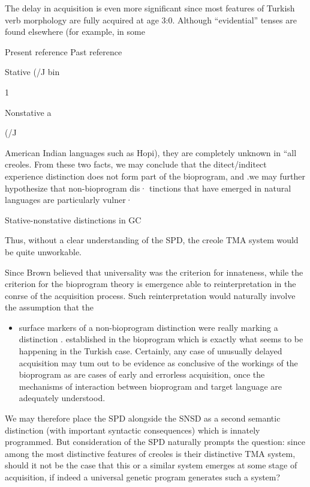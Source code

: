 The delay in acquisition is even more significant since most features of Turkish verb morphology are fully acquired at age 3:0. Although ``evidential'' tenses are found elsewhere (for example, in some

Present reference Past reference

Stative (/J bin

\begin{table}
\caption{1}
\label{tab:3}
\end{table}

Nonstative a

(/J

American Indian languages such as Hopi), they are completely un\-known in ``all creoles. From these two facts, we may conclude that the ditect/inditect experience distinction does not form part of the bio\-program, and .we may further hypothesize that non-bioprogram dis· tinctions that have emerged in natural languages are particularly vulner·

Stative-nonstative distinctions in GC

Thus, without a clear understanding of the SPD, the creole TMA system would be quite unworkable.

Since Brown believed that universality was the criterion for innateness, while the criterion for the bioprogram theory is emergence
able to reinterpretation in the conrse of the acquisition process. Such reinterpretation would naturally involve the assumption that the

\begin{itemize}
\item surface markers of a non-bioprogram distinction were really marking a distinction . established in the bioprogram which is exactly what seems to be happening in the Turkish case. Certainly, any case of unusually delayed acquisition may tum out to be evidence as conclusive
of the workings of the bioprogram as are cases of early and errorless acquisition, once the mechanisms of interaction between bioprogram and target language are adequately understood.
\end{itemize}



We may therefore place the SPD alongside the SNSD as a second
semantic distinction (with important syntactic consequences) which is innately programmed. But consideration of the SPD naturally prompts the question: since among the most distinctive features of creoles is their distinctive TMA system, should it not be the case that this or a similar system emerges at some stage of acquisition, if indeed a universal genetic program generates such a system?

